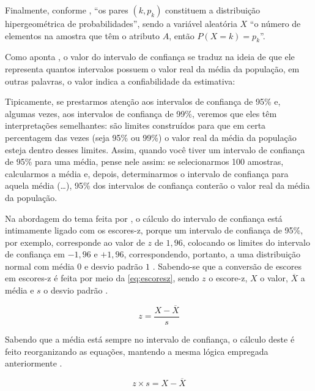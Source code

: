 	Finalmente, conforme , ``os pares $(k, p_k)$ constituem a distribuição hipergeométrica de probabilidades'', sendo a variável aleatória $X$ ``o número de elementos na amostra que têm o atributo $A$, então $P(X = k) = p_k$''.
	
	Como aponta , o valor do intervalo de confiança se traduz na ideia de que ele representa quantos intervalos possuem o valor real da média da população, em outras palavras, o valor indica a confiabilidade da estimativa:
	
	\begin{citacao}
		Tipicamente, se prestarmos atenção aos intervalos de confiança de 95\% e, algumas	vezes, aos intervalos de confiança de 99\%, veremos que eles têm interpretações semelhantes: são limites construídos para que em certa percentagem das vezes (seja 95\% ou 99\%) o	valor real da média da população esteja dentro desses limites. Assim, quando você tiver um intervalo de confiança de 95\% para uma média, pense nele assim: se selecionarmos 100 amostras, calcularmos a média e, depois, determinarmos o intervalo de confiança para aquela média (\dots), 95\% dos intervalos de confiança conterão o valor real da média da população.
	\end{citacao}
	
	Na abordagem do tema feita por , o cálculo do intervalo de confiança está intimamente ligado com os escores-z, porque um intervalo de confiança de 95\%, por exemplo, corresponde ao valor de $z$ de $1,96$, colocando os limites do intervalo de confiança em $-1,96$ e $+1,96$, correspondendo, portanto, a uma distribuição normal com média $0$ e desvio padrão $1$ \cite[p. 45]{field2009}. Sabendo-se que a conversão de escores em escores-z é feita por meio da \autoref{eq:escoresz}, sendo $z$ o escore-z, $X$ o valor, $\overline{X}$ a média e $s$ o desvio padrão \cite[p. 41]{field2009}.
	
	\begin{equation}
	    \label{eq:escoresz}
	    z = \dfrac{X - \overline{X}}{s}
	\end{equation}
	
	Sabendo que a média está sempre no intervalo de confiança, o cálculo deste é feito reorganizando as equações, mantendo a mesma lógica empregada anteriormente \cite[p. 47]{field2009}.
	
	\begin{equation}
	    z \times s = X - \overline{X}
	\end{equation}
	
